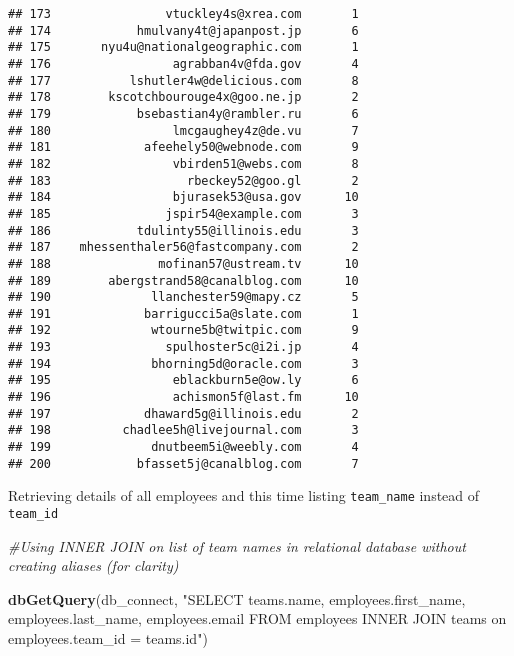 \documentclass[]{article}
\newenvironment{Shaded}{\begin{snugshade}}{\end{snugshade}}
\newcommand{\CommentTok}[1]{\textcolor[rgb]{0.56,0.35,0.01}{\textit{#1}}}
\newcommand{\KeywordTok}[1]{\textcolor[rgb]{0.13,0.29,0.53}{\textbf{#1}}}
\newcommand{\NormalTok}[1]{#1}
\newcommand{\StringTok}[1]{\textcolor[rgb]{0.31,0.60,0.02}{#1}}
\begin{document}
\begin{verbatim}
## 173                vtuckley4s@xrea.com       1
## 174            hmulvany4t@japanpost.jp       6
## 175       nyu4u@nationalgeographic.com       1
## 176                 agrabban4v@fda.gov       4
## 177           lshutler4w@delicious.com       8
## 178        kscotchbourouge4x@goo.ne.jp       2
## 179            bsebastian4y@rambler.ru       6
## 180                 lmcgaughey4z@de.vu       7
## 181             afeehely50@webnode.com       9
## 182                 vbirden51@webs.com       8
## 183                   rbeckey52@goo.gl       2
## 184                 bjurasek53@usa.gov      10
## 185                jspir54@example.com       3
## 186            tdulinty55@illinois.edu       3
## 187    mhessenthaler56@fastcompany.com       2
## 188               mofinan57@ustream.tv      10
## 189        abergstrand58@canalblog.com      10
## 190              llanchester59@mapy.cz       5
## 191             barrigucci5a@slate.com       1
## 192              wtourne5b@twitpic.com       9
## 193                spulhoster5c@i2i.jp       4
## 194              bhorning5d@oracle.com       3
## 195                 eblackburn5e@ow.ly       6
## 196                 achismon5f@last.fm      10
## 197             dhaward5g@illinois.edu       2
## 198          chadlee5h@livejournal.com       3
## 199              dnutbeem5i@weebly.com       4
## 200            bfasset5j@canalblog.com       7
\end{verbatim}

Retrieving details of all employees and this time listing
\texttt{team\_name} instead of \texttt{team\_id}

\begin{Shaded}
\begin{Highlighting}[]
\CommentTok{#Using INNER JOIN on list of team names in relational database without creating aliases (for clarity)}

\KeywordTok{dbGetQuery}\NormalTok{(db_connect,}
\StringTok{"SELECT teams.name, employees.first_name, employees.last_name, employees.email }
\StringTok{FROM employees INNER JOIN teams}
\StringTok{on employees.team_id = teams.id"}\NormalTok{)}
\end{Highlighting}
\end{Shaded}
\end{document}
